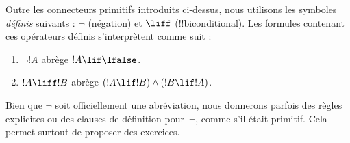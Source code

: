 \documentclass[../../../include/open-logic-section]{subfiles}
\begin{document}
Outre les connecteurs primitifs introduits ci-dessus, nous utilisons
les symboles \emph{définis} suivants : $\lnot$ (négation) et $\liff$
(!!{biconditional}). Les formules contenant ces opérateurs définis
s'interprètent comme suit :
\begin{enumerate}
\item $\lnot !A$ abrège $!A \lif \lfalse$.

\item $!A \liff !B$ abrège $(!A \lif !B) \land (!B \lif !A)$.
\end{enumerate}

Bien que $\lnot$ soit officiellement une abréviation, nous donnerons
parfois des règles explicites ou des clauses de définition pour~$\lnot$,
comme s'il était primitif. Cela permet surtout de proposer des exercices.
\end{document}
